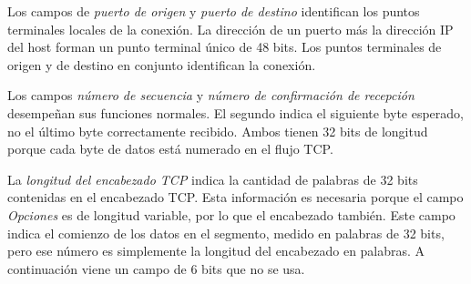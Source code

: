 \documentclass[10pt,a4paper]{report}
\begin{document}
	\par Los campos de \textit{puerto de origen} y \textit{puerto de destino} identifican 
los puntos terminales locales de la conexión. La dirección de un puerto más la dirección 
IP del host forman un punto terminal único de 48 bits. Los puntos terminales de origen 
y de destino en conjunto identifican la conexión.

	\par Los campos \textit{número de secuencia} y \textit{número de confirmación de 
recepción} desempeñan sus funciones normales. El segundo indica el siguiente byte 
esperado, no el último byte correctamente recibido. Ambos tienen 32 bits de longitud porque cada byte de datos está numerado en el flujo TCP.

	\par La \textit{longitud del encabezado TCP} indica la cantidad de palabras de 32 
bits contenidas en el encabezado TCP. Esta información es necesaria porque el campo 
\textit{Opciones} es de longitud variable, por lo que el encabezado también. Este 
campo indica el comienzo de los datos en el segmento, medido en palabras de 32 bits, 
pero ese número es simplemente la longitud del encabezado en palabras. A 
continuación viene un campo de 6 bits que no se usa.
\end{document}
